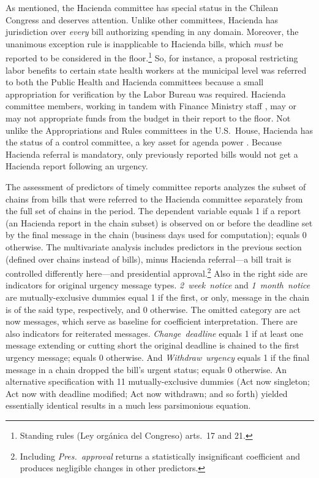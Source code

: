 \documentclass[letter,12pt]{article}
\begin{document}

As mentioned, the Hacienda committee has special status in the Chilean Congress and deserves attention. Unlike other committees, Hacienda has jurisdiction over \emph{every} bill authorizing spending in any domain. Moreover, the unanimous exception rule is inapplicable to Hacienda bills, which \emph{must} be reported to be considered in the floor.\footnote{Standing rules (Ley org\'anica del Congreso) arts.\ 17 and 21.} So, for instance, a proposal restricting labor benefits to certain state health workers at the municipal level was referred to both the Public Health and Hacienda committees because a small appropriation for verification by the Labor Bureau was required. Hacienda committee members, working in tandem with Finance Ministry staff \citep{aleman.navia.UrgChi.2009}, may or may not appropriate funds from the budget in their report to the floor. Not unlike the Appropriations and Rules committees in the U.S.\ House, Hacienda has the status of a control committee, a key asset for agenda power \citep{kiewiet.mccubbins.1991}. Because Hacienda referral is mandatory, only previously reported bills would not get a Hacienda report following an urgency. 

The assessment of predictors of timely committee reports analyzes the subset of chains from bills that were referred to the Hacienda committee separately from the full set of chains in the period. The dependent variable equals 1 if a report (an Hacienda report in the chain subset) is observed on or before the deadline set by the final message in the chain (business days used for computation); equals 0 otherwise. The multivariate analysis includes predictors in the previous section (defined over chains instead of bills), minus Hacienda referral---a bill trait is controlled differently here---and presidential approval.\footnote{Including \emph{Pres.~approval} returns a statistically insignificant coefficient and produces negligible changes in other predictors.} Also in the right side are indicators for original urgency message types. \emph{2~week~notice} and \emph{1~month~notice} are mutually-exclusive dummies equal 1 if the first, or only, message in the chain is of the said type, respectively, and 0 otherwise. The omitted category are act now messages, which serve as baseline for coefficient interpretation. There are also indicators for reiterated messages. \emph{Change~deadline} equals 1 if at least one message extending or cutting short the original deadline is chained to the first urgency message; equals 0 otherwise. And \emph{Withdraw~urgency} equals 1 if the final message in a chain dropped the bill's urgent status; equals 0 otherwise. An alternative specification with 11 mutually-exclusive dummies (Act now singleton; Act now with deadline modified; Act now withdrawn; and so forth) yielded essentially identical results in a much less parsimonious equation.  
\end{document}
